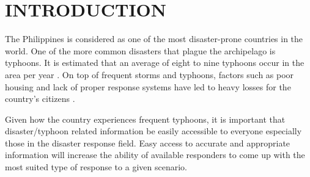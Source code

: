 \chapter{INTRODUCTION}

The Philippines is considered as one of the most disaster-prone countries in the world. One of the more common disasters that plague the archipelago is typhoons. It is estimated that an average of eight to nine typhoons occur in the area per year \cite{BR2013}.  On top of frequent storms and typhoons, factors such as poor housing and lack of proper response systems have led to heavy losses for the country's citizens \cite{BR2013, WH2014}.  

    Given how the country experiences frequent typhoons, it is important that disaster/typhoon
related information be easily accessible to everyone especially those in the disaster response field. Easy access to accurate and appropriate information will increase the ability of available responders to come up with the most suited type of response to a given scenario. 








